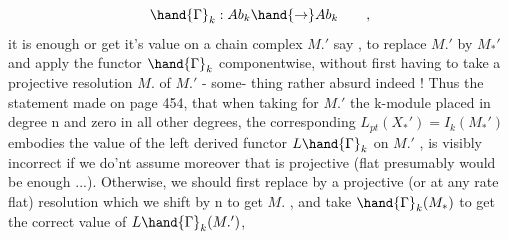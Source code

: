 
\[ \hand{\Gamma}_k : Ab_k \hand{\to} Ab_k \qquad , \]
it is enough\hand{,} or get it's value on a chain complex  $M.'$ say ,
to replace  $M.'$ by $M_*'$ and apply the functor $\hand{\Gamma}_k$ componentwise,
without first having to take a projective resolution $M.$ of $M.'$ - some-%
thing rather absurd indeed ! Thus the statement made on page 454, that
when taking for $M.'$ the k-module \hand{$\pi$} placed in degree n and zero in all
other degrees, the corresponding $L_{pt}(X_*') = I_k(M_*')$ embodies the
value of the left derived functor $L\hand{\Gamma}_k$ on $M.'$ , is visibly incorrect if
we do'nt assume moreover that \hand{$\pi$} is projective (flat presumably would be
enough ...). Otherwise, we should first replace \hand{$\pi$} by a projective
(or at any rate flat) resolution\hand{,} which we shift by n to get $M.$ , and 
take $\hand{\Gamma}_k(M_*)$ to get the correct value of $L\hand{\Gamma}_k(M.')$,

